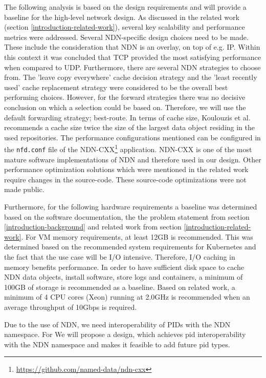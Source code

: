 The following analysis is based on the design requirements and will provide a baseline for the high-level network design. As discussed in the related work (section \ref{introduction-related-work}), several key scalability and performance metrics were addressed. Several NDN-specific design choices need to be made. These include the consideration that NDN is an overlay, on top of e.g. IP. Within this context it was concluded that TCP provided the most satisfying performance when compared to UDP. Furthermore, there are several NDN strategies to choose from. The 'leave copy everywhere' cache decision strategy and the 'least recently used' cache replacement strategy were considered to be the overall best performing choices. However, for the forward strategies there was no decisive conclusion on which a selection could be based on. Therefore, we will use the default forwarding strategy; best-route. In terms of cache size, Koulouzis et al. recommends a cache size twice the size of the largest data object residing in the used repositories. The performance configurations mentioned can be configured in the \texttt{nfd.conf} file of the NDN-CXX\footnote{\url{https://github.com/named-data/ndn-cxx}} application. NDN-CXX is one of the most mature software implementations of NDN and therefore used in our design. Other performance optimization solutions which were mentioned in the related work require changes in the source-code. These source-code optimizations were not made public.

Furthermore, for the following hardware requirements a baseline was determined based on the software documentation, the the problem statement from section \ref{introduction-background} and related work from section \ref{introduction-related-work}. For VM memory requirements, at least 12GB is recommended. This was determined based on the recommended system requirements for Kubernetes \cite{kubernetes-system-requirements} and the fact that the use case will be I/O intensive. Therefore, I/O caching in memory benefits performance. In order to have sufficient disk space to cache NDN data objects, install software, store logs and containers, a minimum of 100GB of storage is recommended as a baseline. Based on related work, a minimum of 4 CPU cores (Xeon) running at 2.0GHz is recommended when an average throughput of 10Gbps is required.

%

Due to the use of NDN, we need interoperability of PIDs with the NDN namespace. For 
We will propose a design, which achieves \gls{pid} interoperability with the NDN namespace and makes it feasible to add future \gls{pid} types.



